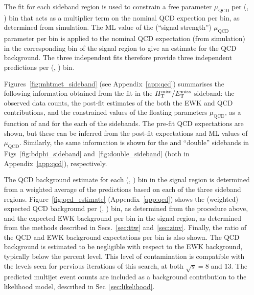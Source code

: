 The fit for each sideband region is used to constrain a free parameter
$\mu_{\textrm{QCD}}$ per (\njet, \scalht) bin that acts as a
multiplier term on the nominal QCD expection per bin, as determined
from simulation. The ML value of the (``signal strength'')
$\mu_{\textrm{QCD}}$ parameter per bin is applied to the nominal QCD
expectation (from simulation) in the corresponding bin of the signal
region to give an estimate for the QCD background. The three
independent fits therefore provide three independent predictions per
(\njet, \scalht) bin.

Figures~\ref{fig:mhtmet_sideband} (see Appendix~\ref{app:qcd})
summarises the following information obtained from the fit in the
$\mbox{$\mbox{$H_{\rm T}^{\rm miss}$} / \mbox{$E_\text{T}^{\rm miss}$}$}$ sideband: the observed data counts, the post-fit estimates
of the both the EWK and QCD contributions, and the constrained values
of the floating parameters $\mu_{\textrm{QCD}}$, as a function of
\njet and \scalht for the each of the sidebands. The pre-fit QCD
expectations are shown, but these can be inferred from the post-fit
expectations and ML values of $\mu_{\textrm{QCD}}$. Similarly, the
same information is shown for the \bdphi and ``double'' sidebands in
Figs~\ref{fig:bdphi_sideband} and~\ref{fig:double_sideband} (both in
Appendix~\ref{app:qcd}), respectively.

The QCD background estimate for each (\njet, \scalht) bin in the
signal region is determined from a weighted average of the predictions
based on each of the three sideband regions. 
Figure~\ref{fig:qcd_estimate} (Appendix~\ref{app:qcd}) shows the
(weighted) expected QCD background per (\njet, \scalht) bin, as
determined from the procedure above, and the expected EWK background
per bin in the signal region, as determined from the methods described
in Secs.~\ref{sec:ttw} and~\ref{sec:zinv}. Finally, the ratio of the
QCD and EWK background expectations per bin is also shown. The QCD
background is estimated to be negligible with respect to the EWK
background, typically below the percent level. This level of
contamination is compatible with the levels seen for pervious
iterations of this search, at both $\sqrt{s} = 8$ and 13\TeV. The
predicted multijet event counts are included as a background
contribution to the likelihood model, described in
Sec~\ref{sec:likelihood}.

